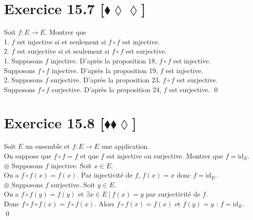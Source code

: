 \documentclass[10pt]{article}
\begin{document}
\section*{Exercice 15.7 [$\blacklozenge\lozenge\lozenge$]}
\begin{tcolorbox}[enhanced, width=7.6in, center, size=fbox, fontupper=\large, drop shadow southwest]
    Soit $f:E\to E$. Montrer que\\
    1. $f$ est injective si et seulement si $f \circ f$ est injective.\\
    2. $f$ est surjective si et seulement si $f \circ f$ est surjective.\\
    1. Supposons $f$ injective. D'après la proposition 18, $f \circ f$ est injective.\\
    Supposons $f \circ f$ injective. D'après la proposition 19, $f$ est injective.\\
    2. Supposons $f$ surjective. D'après la proposition 23, $f \circ f$ est surjective.\\
    Supposons $f \circ f$ surjective. D'après la proposition 24, $f$ est surjective.
    \qed
\end{tcolorbox}

\section*{Exercice 15.8 [$\blacklozenge\blacklozenge\lozenge$]}
\begin{tcolorbox}[enhanced, width=7.6in, center, size=fbox, fontupper=\large, drop shadow southwest]
    Soit $E$ un ensemble et $f:E\to E$ une application.\\
    On suppose que $f\circ f = f$ et que $f$ est injective ou surjective. Montrer que $f = \text{id}_E$.\\[0.2cm]
    $\circledcirc$ Supposons $f$ injective. Soit $x \in E$.\\
    On a $f \circ f (x) = f(x)$. Par injectivité de $f$, $f(x) = x$ donc $f = \text{id}_E$.\\[0.15cm]
    $\circledcirc$ Supposons $f$ surjective. Soit $y \in E$.\\
    On a $f \circ f (y) = f(y)$ et $\exists x \in E ~ | ~ f(x) = y$ par surjectivité de $f$.\\
    Donc $f \circ f \circ f (x) = f \circ f (x)$. Alors $f \circ f (x) = f(x)$ et $f(y) = y$ : $f = \text{id}_E$.\\
    \qed
\end{tcolorbox}
\end{document}
